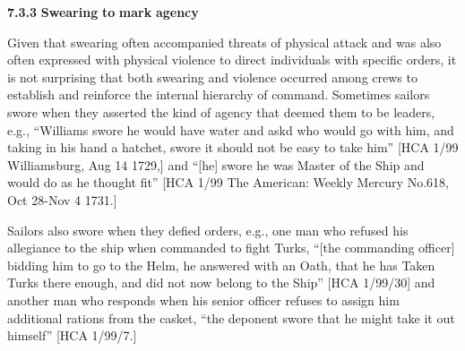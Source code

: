\textbf{7.3.3} \textbf{Swearing} \textbf{to} \textbf{mark} \textbf{agency}

  Given that swearing often accompanied threats of physical attack and was also often expressed with physical violence to direct individuals with specific orders, it is not surprising that both swearing and violence occurred among crews to establish and reinforce the internal hierarchy of command. Sometimes sailors swore when they asserted the kind of agency that deemed them to be leaders, e.g., “Williams swore he would have water and askd who would go with him, and taking in his hand a hatchet, swore it should not be easy to take him” [HCA 1/99 Williamsburg, Aug 14 1729,] and “[he] swore he was Master of the Ship and would do as he thought fit” [HCA 1/99 The American: Weekly Mercury No.618, Oct 28-Nov 4 1731.] 

Sailors also swore when they defied orders, e.g., one man who refused his allegiance to the ship when commanded to fight Turks, “[the commanding officer] bidding him to go to the Helm, he answered with an Oath, that he has Taken Turks there enough, and did not now belong to the Ship” [HCA 1/99/30] and another man who responds when his senior officer refuses to assign him additional rations from the casket, “the deponent swore that he might take it out himself” [HCA 1/99/7.] 

